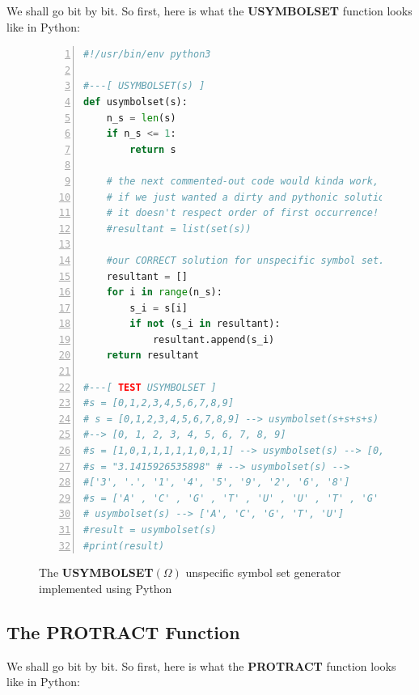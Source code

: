 \documentclass[a4paper, 18pt]{book} %
\begin{document}
We shall go bit by bit. So first, here is what the \textbf{USYMBOLSET} function looks like in Python:

\begin{figure}[H]
  \begin{center}
  \begin{lstlisting}[caption={The USYMBOLSET}, label={LST_USYMBOLSET}, language=Python, frame=single, numbers=left, basicstyle=\ttfamily,  commentstyle=\color{blue}]
#!/usr/bin/env python3

#---[ USYMBOLSET(s) ]
def usymbolset(s):
    n_s = len(s)
    if n_s <= 1:
        return s

    # the next commented-out code would kinda work,
    # if we just wanted a dirty and pythonic solution, but 
    # it doesn't respect order of first occurrence!
    #resultant = list(set(s))
 
    #our CORRECT solution for unspecific symbol set.. 
    resultant = []
    for i in range(n_s):
        s_i = s[i]
        if not (s_i in resultant):
            resultant.append(s_i)
    return resultant

#---[ TEST USYMBOLSET ]
#s = [0,1,2,3,4,5,6,7,8,9]
# s = [0,1,2,3,4,5,6,7,8,9] --> usymbolset(s+s+s+s) 
#--> [0, 1, 2, 3, 4, 5, 6, 7, 8, 9]
#s = [1,0,1,1,1,1,1,0,1,1] --> usymbolset(s) --> [0,1]
#s = "3.1415926535898" # --> usymbolset(s) --> 
#['3', '.', '1', '4', '5', '9', '2', '6', '8']
#s = ['A' , 'C' , 'G' , 'T' , 'U' , 'U' , 'T' , 'G' , 'C' , 'A'] #w/duplication
# usymbolset(s) --> ['A', 'C', 'G', 'T', 'U']
#result = usymbolset(s)
#print(result)
\end{lstlisting}
  \end{center}
  \caption{The \textbf{USYMBOLSET}$(\Omega)$ unspecific symbol set generator implemented using Python}
\end{figure}


\subsection{The PROTRACT Function}

We shall go bit by bit. So first, here is what the \textbf{PROTRACT} function looks like in Python:
\end{document}
